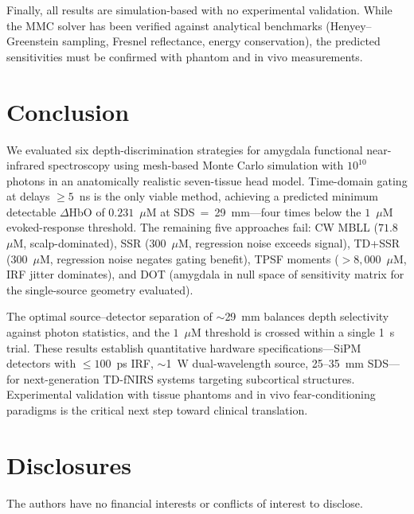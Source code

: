 \documentclass[11pt,a4paper]{article}
\begin{document}
Finally, all results are simulation-based with no experimental validation. While the MMC solver has been verified against analytical benchmarks (Henyey--Greenstein sampling, Fresnel reflectance, energy conservation), the predicted sensitivities must be confirmed with phantom and in vivo measurements.


\section{Conclusion}

We evaluated six depth-discrimination strategies for amygdala functional near-infrared spectroscopy using mesh-based Monte Carlo simulation with $10^{10}$ photons in an anatomically realistic seven-tissue head model. Time-domain gating at delays $\geq 5$~ns is the only viable method, achieving a predicted minimum detectable $\Delta$HbO of $0.231$~$\mu$M at SDS~=~29~mm---four times below the $1$~$\mu$M evoked-response threshold. The remaining five approaches fail: CW MBLL ($71.8$~$\mu$M, scalp-dominated), SSR ($300$~$\mu$M, regression noise exceeds signal), TD+SSR ($300$~$\mu$M, regression noise negates gating benefit), TPSF moments ($>8{,}000$~$\mu$M, IRF jitter dominates), and DOT (amygdala in null space of sensitivity matrix for the single-source geometry evaluated).

The optimal source--detector separation of $\sim$29~mm balances depth selectivity against photon statistics, and the $1$~$\mu$M threshold is crossed within a single 1~s trial. These results establish quantitative hardware specifications---SiPM detectors with $\leq 100$~ps IRF, $\sim$1~W dual-wavelength source, 25--35~mm SDS---for next-generation TD-fNIRS systems targeting subcortical structures. Experimental validation with tissue phantoms and in vivo fear-conditioning paradigms is the critical next step toward clinical translation.


\section*{Disclosures}

The authors have no financial interests or conflicts of interest to disclose.


\end{document}
